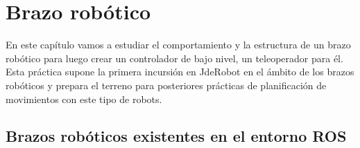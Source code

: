 \chapter{Brazo robótico}
\label{ch:BrazoRobotico}

En este capítulo vamos a estudiar el comportamiento y la estructura de un brazo robótico para luego crear un controlador de bajo nivel, un teleoperador para él. Esta práctica supone la primera incursión en JdeRobot en el ámbito de los brazos robóticos y prepara el terreno para posteriores prácticas de planificación de movimientos con este tipo de robots.

\section{Brazos robóticos existentes en el entorno ROS}
\label{sec:br_brazosexistentes}


